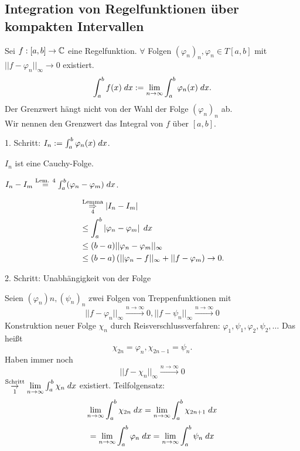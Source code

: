 \documentclass[../ana2.tex]{subfiles}
\begin{document}
\subsection{Integration von Regelfunktionen 
über kompakten Intervallen}
\begin{satzdefi}
    Sei \( \abb{f}{[a,b]}{\C} \) eine Regelfunktion.
    \( \forall \) Folgen \( (\varphi_n)_n, \varphi_n \in T[a,b] \)
    mit \( ||f - \varphi_n||_\infty \rightarrow 0 \) existiert.
    \[ \integral{f(x)}{a}{b} 
    := \limes{n} \integral{\varphi_n(x)}{a}{b}. \]
    Der Grenzwert hängt nicht von der Wahl der Folge
    \( (\varphi_n)_n \) ab.\\
    Wir nennen den Grenzwert das Integral von 
    \( f \) über \( [a,b] \).
\end{satzdefi}
\begin{bew}
    1. Schritt: \( I_n := \integral{\varphi_n(x)}{a}{b} \).
    \begin{beh}
        \( I_n \) ist eine Cauchy-Folge.
    \end{beh}
    \begin{bew}
        \( I_n - I_m \oversett{Lem. 4}{=} 
        \integral{(\varphi_n - \varphi_m)}{a}{b} \).

        \begin{align*}
            &\overundersett{Lemma}{4}{\Rightarrow} \abs{I_n - I_m} \\
            &\leq \integral{\abs{\varphi_n - \varphi_m}}{a}{b} \\
            &\leq (b-a) ||\varphi_n - \varphi_m||_\infty \\
            &\leq (b-a) \left( ||\varphi_n - f||_\infty 
            + ||f - \varphi_m \right) \rightarrow 0.
        \end{align*}
    \end{bew}
    2. Schritt: Unabhängigkeit von der Folge
    \begin{bew}
        Seien \( (\varphi_n)n, (\psi_n)_n \) zwei Folgen 
        von Treppenfunktionen mit 
        \[ ||f-\varphi_n||_\infty \overset{n\rightarrow \infty}{\rightarrow} 0, 
        ||f-\psi_n||_\infty \overset{n\rightarrow \infty}{\longrightarrow} 0 \]
        Konstruktion neuer Folge \(\chi_n \) durch Reisverschlussverfahren:
        \( \varphi_1, \psi_1, \varphi_2, \psi_2, \ldots \)
        Das heißt
        \[ \chi_{2n} = \varphi_n, \chi_{2n-1} = \psi_n. \]
        Haben immer noch
        \[ ||f - \chi_n||_\infty \overset{n \rightarrow \infty}{\rightarrow} 0 \]
        \( \overundersett{Schritt}{1}{\rightarrow} \limes{n} \integral{\chi_n}{a}{b} \)
        existiert.
        Teilfolgensatz:     
        \[ \limes{n} \integral{\chi_{2n}}{a}{b} = \limes{n} 
        \integral{\chi_{2n+1}}{a}{b} \]
        \[ = \limes{n} \integral{\varphi_n}{a}{b} 
        = \limes{n} \integral{\psi_n}{a}{b} \]
    \end{bew}
\end{bew}
\end{document}
